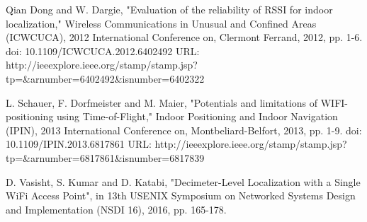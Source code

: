\begin{thebibliography}{1}
Qian Dong and W. Dargie, "Evaluation of the reliability of RSSI for indoor localization," Wireless Communications in Unusual and Confined Areas (ICWCUCA), 2012 International Conference on, Clermont Ferrand, 2012, pp. 1-6.
doi: 10.1109/ICWCUCA.2012.6402492
URL: http://ieeexplore.ieee.org/stamp/stamp.jsp?tp=\&arnumber=6402492\&isnumber=6402322

L. Schauer, F. Dorfmeister and M. Maier, "Potentials and limitations of WIFI-positioning using Time-of-Flight," Indoor Positioning and Indoor Navigation (IPIN), 2013 International Conference on, Montbeliard-Belfort, 2013, pp. 1-9.
doi: 10.1109/IPIN.2013.6817861
URL: http://ieeexplore.ieee.org/stamp/stamp.jsp?tp=\&arnumber=6817861\&isnumber=6817839

D.  Vasisht, S.  Kumar and D.  Katabi, "Decimeter-Level Localization with a Single WiFi Access Point", in 13th USENIX Symposium on Networked Systems Design and Implementation (NSDI 16), 2016, pp. 165-178.

\end{thebibliography}
